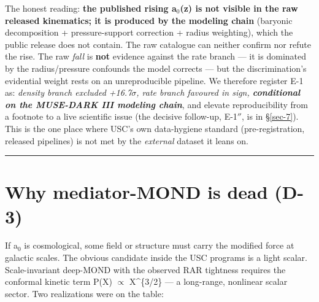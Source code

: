 \documentclass[aps,prd,preprint,nofootinbib,superscriptaddress]{revtex4-2}
\begin{document}
The honest reading: \textbf{the published rising a\(_{0}\)(z) is not
visible in the raw released kinematics; it is produced by the modeling
chain} (baryonic decomposition + pressure-support correction + radius
weighting), which the public release does not contain. The raw catalogue
can neither confirm nor refute the rise. The raw \emph{fall} is
\textbf{not} evidence against the rate branch --- it is dominated by the
radius/pressure confounds the model corrects --- but the
discrimination's evidential weight rests on an unreproducible pipeline.
We therefore register E-1 as: \emph{density branch excluded
+16.7\(\sigma\), rate branch favoured in sign, \textbf{conditional on
the MUSE-DARK III modeling chain}}, and elevate reproducibility from a
footnote to a live scientific issue (the decisive follow-up, E-1\(''\),
is in §\ref{sec-7}). This is the one place where USC's own data-hygiene
standard (pre-registration, released pipelines) is not met by the
\emph{external} dataset it leans on.

\begin{center}\rule{0.5\linewidth}{0.5pt}\end{center}

\section{Why mediator-MOND is dead (D-3)}\label{sec-4}

If a\(_{0}\) is cosmological, some field or structure must carry the
modified force at galactic scales. The obvious candidate inside the USC
programs is a light scalar. Scale-invariant deep-MOND with the observed
RAR tightness requires the conformal kinetic term P(X) \(\propto\)
X\^{}\{3/2\} \citep{Milgrom:2009gv} --- a long-range, nonlinear scalar
sector. Two realizations were on the table:
\end{document}
